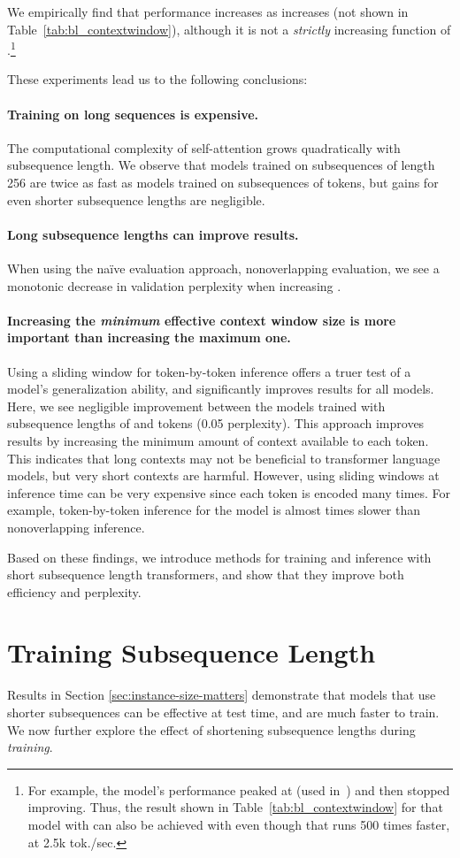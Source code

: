 \documentclass[11pt,a4paper]{article}
\begin{document}
We empirically find that performance increases as  increases (not shown in Table~\ref{tab:bl_contextwindow}), although it is not a  \emph{strictly} increasing function of .\footnote{For example, the  model's performance peaked at  (used in~\citet{baevski}) and then stopped improving. Thus,  the result shown in Table~\ref{tab:bl_contextwindow} for that model with  can also be achieved with  even though that runs 500 times faster, at 2.5k tok./sec. }


These experiments lead us to the following conclusions:
\paragraph{Training on long sequences is expensive.} The computational complexity of self-attention grows quadratically with subsequence length. We observe that models trained on subsequences of length 256 are twice as fast as models trained on subsequences of  tokens, but gains for even shorter subsequence lengths are negligible.

\paragraph{Long subsequence lengths can improve results.} When using the na\"{i}ve evaluation approach, nonoverlapping evaluation, we see a monotonic decrease in validation perplexity when increasing . 

\paragraph{Increasing the \emph{minimum} effective context window size is more important than increasing the maximum one.} 
Using a sliding window for token-by-token inference offers a truer test of a model's generalization ability, and significantly improves results for all models. Here, we see negligible improvement between the models trained with subsequence lengths of  and  tokens (0.05 perplexity). 
This approach improves results by increasing the minimum amount of context available to each token. This indicates that long contexts may not be beneficial to transformer language models, but very short contexts are harmful. However, using sliding windows at inference time can be very expensive since each token is encoded many times. For example, token-by-token inference for the  model is almost  times slower than nonoverlapping inference.  



Based on these findings, we introduce methods for training and inference with short subsequence length transformers, and show that they improve both efficiency and perplexity. \section{Training Subsequence Length}
\label{sec:ss}
Results in Section \ref{sec:instance-size-matters} demonstrate that models that use shorter subsequences can be effective at test time, and are much faster to train. We now further explore the effect of shortening subsequence lengths during \emph{training}.
\end{document}
